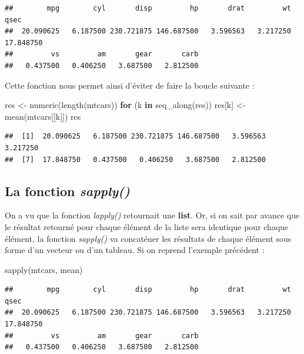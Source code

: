 \documentclass[
]{book}
\newenvironment{Shaded}{\begin{snugshade}}{\end{snugshade}}
\newcommand{\ControlFlowTok}[1]{\textcolor[rgb]{0.13,0.29,0.53}{\textbf{#1}}}
\newcommand{\FunctionTok}[1]{\textcolor[rgb]{0.00,0.00,0.00}{#1}}
\newcommand{\NormalTok}[1]{#1}
\newcommand{\OtherTok}[1]{\textcolor[rgb]{0.56,0.35,0.01}{#1}}
\theoremstyle{definition}
\theoremstyle{definition}
\theoremstyle{definition}
\theoremstyle{definition}
\theoremstyle{remark}
\begin{document}
\begin{verbatim}
##        mpg        cyl       disp         hp       drat         wt       qsec 
##  20.090625   6.187500 230.721875 146.687500   3.596563   3.217250  17.848750 
##         vs         am       gear       carb 
##   0.437500   0.406250   3.687500   2.812500
\end{verbatim}

Cette fonction nous permet ainsi d'éviter de faire la boucle suivante :

\begin{Shaded}
\begin{Highlighting}[]
\NormalTok{res }\OtherTok{\textless{}{-}} \FunctionTok{numeric}\NormalTok{(}\FunctionTok{length}\NormalTok{(mtcars))}
\ControlFlowTok{for}\NormalTok{ (k }\ControlFlowTok{in} \FunctionTok{seq\_along}\NormalTok{(res))}
\NormalTok{  res[k] }\OtherTok{\textless{}{-}} \FunctionTok{mean}\NormalTok{(mtcars[[k]])}
\NormalTok{res}
\end{Highlighting}
\end{Shaded}

\begin{verbatim}
##  [1]  20.090625   6.187500 230.721875 146.687500   3.596563   3.217250
##  [7]  17.848750   0.437500   0.406250   3.687500   2.812500
\end{verbatim}

\hypertarget{la-fonction-sapply}{%
\subsection{\texorpdfstring{La fonction \emph{sapply()}}{La fonction sapply()}}\label{la-fonction-sapply}}

On a vu que la fonction \emph{lapply()} retournait une \textbf{list}. Or, si on sait par avance que le résultat retourné pour chaque élément de la liste sera identique pour chaque élément, la fonction \emph{sapply()} va concaténer les résultats de chaque élément sous forme d'un vecteur ou d'un tableau. Si on reprend l'exemple précédent :

\begin{Shaded}
\begin{Highlighting}[]
\FunctionTok{sapply}\NormalTok{(mtcars, mean)}
\end{Highlighting}
\end{Shaded}

\begin{verbatim}
##        mpg        cyl       disp         hp       drat         wt       qsec 
##  20.090625   6.187500 230.721875 146.687500   3.596563   3.217250  17.848750 
##         vs         am       gear       carb 
##   0.437500   0.406250   3.687500   2.812500
\end{verbatim}
\end{document}
